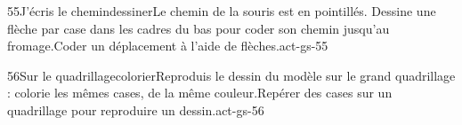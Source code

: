 \begin{activite}{55}{J’écris le chemin}{dessiner}{Le chemin de la souris est en pointillés. {\otBold\color{otNavy}Dessine} une flèche par case dans les cadres du bas pour coder son chemin jusqu’au fromage.}{Coder un déplacement à l’aide de flèches.}{act-gs-55}
\end{activite}
\begin{activite}{56}{Sur le quadrillage}{colorier}{Reproduis le dessin du modèle sur le grand quadrillage : {\otBold\color{otNavy}colorie} les mêmes cases, de la même couleur.}{Repérer des cases sur un quadrillage pour reproduire un dessin.}{act-gs-56}
\end{activite}
